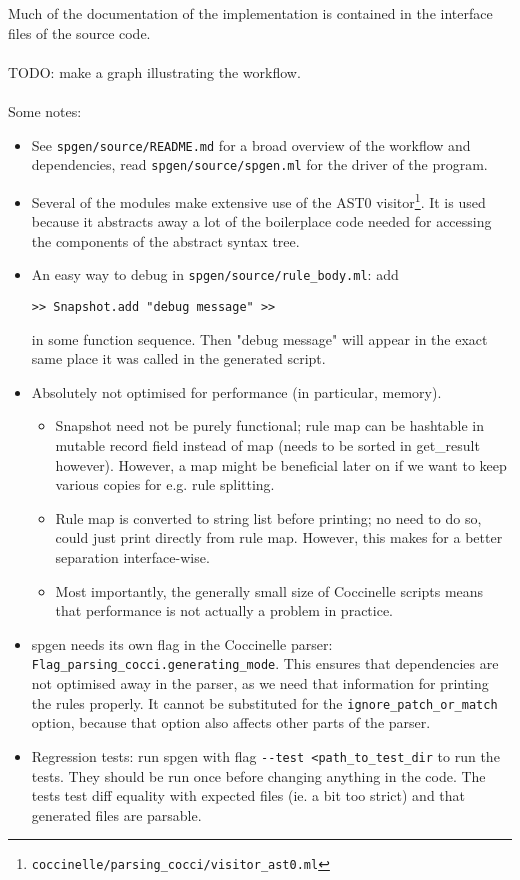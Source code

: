 Much of the documentation of the implementation is contained in the interface files of the source code.\\\\
TODO: make a graph illustrating the workflow.\\\\
Some notes:
\begin{itemize}
\item See \texttt{spgen/source/README.md} for a broad overview of the workflow and dependencies, read \texttt{spgen/source/spgen.ml} for the driver of the program.
\item Several of the modules make extensive use of the AST0 visitor\footnote{\texttt{coccinelle/parsing\_cocci/visitor\_ast0.ml}}. It is used because it abstracts away a lot of the boilerplace code needed for accessing the components of the abstract syntax tree.
\item An easy way to debug in \texttt{spgen/source/rule\_body.ml}: add
\begin{verbatim}
>> Snapshot.add "debug message" >>
\end{verbatim}
in some function sequence. Then "debug message" will appear in the exact same place it was called in the generated script.
\item Absolutely not optimised for performance (in particular, memory).
  \begin{itemize}
  \item Snapshot need not be purely functional; rule map can be hashtable in mutable record field instead of map (needs to be sorted in get\_result however). However, a map might be beneficial later on if we want to keep various copies for e.g. rule splitting.
  \item Rule map is converted to string list before printing; no need to do so, could just print directly from rule map. However, this makes for a better separation interface-wise.
  \item Most importantly, the generally small size of Coccinelle scripts means that performance is not actually a problem in practice.
  \end{itemize}
\item spgen needs its own flag in the Coccinelle parser: \texttt{Flag\_parsing\_cocci.generating\_mode}. This ensures that dependencies are not optimised away in the parser, as we need that information for printing the rules properly. It cannot be substituted for the \texttt{ignore\_patch\_or\_match} option, because that option also affects other parts of the parser.
\item Regression tests: run spgen with flag \texttt{-{}-test <path\_to\_test\_dir} to run the tests. They should be run once before changing anything in the code. The tests test diff equality with expected files (ie. a bit too strict) and that generated files are parsable.
\end{itemize}
